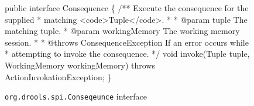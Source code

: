 \begin{figure}
\begin{codelisting}
public interface Consequence
\{    
    /** Execute the consequence for the supplied
     *  matching <code>Tuple</code>.
     *
     *  @param tuple The matching tuple.
     *  @param workingMemory The working memory session.
     *
     *  @throws ConsequenceException If an error occurs while
     *          attempting to invoke the consequence.
     */
    void invoke(Tuple tuple,
                WorkingMemory workingMemory) throws ActionInvokationException;
\}
\end{codelisting}
\label{code.Conseqeunce}
\caption{\texttt{org.drools.spi.Conseqeunce} interface}
\end{figure}

\newpage
